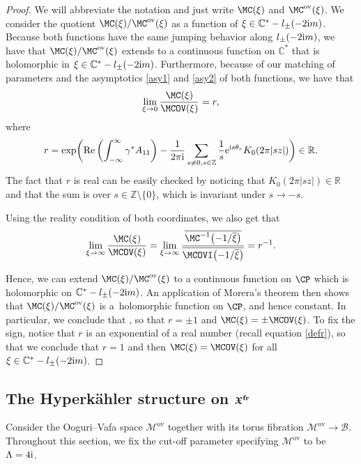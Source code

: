 \begin{proof} We will abbreviate the notation and just write $\MC(\xi)$ and $\MC^{\text{ov}}(\xi)$.
We consider the quotient $\MC(\xi)/\MC^{\text{ov}}(\xi)$ as a function of $\xi \in \mathbb{C}^*-l_{\pm}(-2{\rm i}m)$. Because both functions have the same jumping behavior along $l_{\pm}(-2{\rm i}m)$, we have that $\MC(\xi)/\MC^{\text{ov}}(\xi)$ extends to a continuous function on $\mathbb{C}^*$ that is holomorphic in $\xi \in \mathbb{C}^*-l_{\pm}(-2{\rm i}m)$. Furthermore, because of our matching of parameters and the asymptotics \eqref{asy1} and \eqref{asy2} of both functions, we have that
\begin{gather}
 \lim_{\xi \to 0}\frac{\MC(\xi)}{\MCOV(\xi)}= r,\label{defr}
\end{gather}
where
\begin{gather*}
 r=\exp \biggl( \operatorname{Re}\left(\int_{-\infty}^{\infty}\gamma^*A_{11}\right) -\frac{1}{2\pi {\rm i}}\sum_{s\neq 0, s \in \mathbb{Z}}\frac{1}{s}{\rm e}^{{\rm i}s\theta_e}K_0(2\pi |sz|) \biggr)\in \mathbb{R}.
\end{gather*}
The fact that $r$ is real can be easily checked by noticing that $K_0(2\pi|sz|)\in \mathbb{R}$ and that the sum is over $s\in \mathbb{Z}\setminus\{0\}$, which is invariant under $s\to -s$.

Using the reality condition of both coordinates, we also get that
\begin{equation*}
 \lim_{\xi \to \infty}\frac{\MC(\xi)}{\MCOV(\xi)}= \lim_{\xi \to \infty}\frac{\overline{\MC^{-1}\bigl(-1/\overline{\xi}\bigr)}}{\overline{\MCOVI\bigl(-1/\overline{\xi}\bigr)}}=r^{-1}.
\end{equation*}

Hence, we can extend $\MC(\xi)/\MC^{\text{ov}}(\xi)$ to a continuous function on $\CP$ which is holomorphic on $\mathbb{C}^*-l_{\pm}(-2{\rm i}m)$. An application of Morera's theorem then shows that $\MC(\xi)/\MC^{\text{ov}}(\xi)$ is a~holomorphic function on $\CP$, and hence constant. In particular, we conclude that
,
so that $r=\pm 1$ and $\MC(\xi)=\pm \MCOV(\xi)$. To fix the sign, notice that $r$ is an exponential of a real number (recall equation \eqref{defr}), so that we conclude that $r=1$ and then $\MC(\xi)=\MCOV(\xi)$ for all~${\xi \in \mathbb{C}^* - l_{\pm}(-2{\rm i}m)}$.
\end{proof}


\subsection[The Hyperk\"ahler structure on X\^{}\{fr\}]{The Hyperk\"ahler structure on $\boldsymbol{\mathfrak{X}^{{\rm fr}}}$}
Consider the Ooguri--Vafa space $\mathcal{M}^{\text{ov}}$ together with its torus fibration $\mathcal{M}^{\text{ov}}\to \mathcal{B}$. Throughout this section, we fix the cut-off parameter specifying $\mathcal{M}^{\text{ov}}$ to be $\Lambda=4{\rm i}$.

